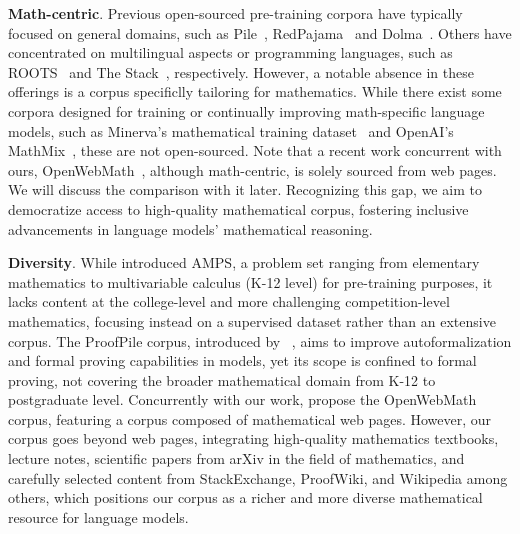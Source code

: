 \textbf{Math-centric}. Previous open-sourced pre-training corpora have typically focused on general domains, such as Pile~\citep{DBLP:journals/corr/abs-2101-00027-pile}, RedPajama~\citep{RedPajama} and Dolma~\citep{allenai-dolma}. Others have concentrated on multilingual aspects or programming languages, such as ROOTS~\citep{DBLP:conf/nips/LaurenconSWAMSW22-roots} and The Stack~\citep{DBLP:journals/corr/abs-2211-15533-stack}, respectively. However, a notable absence in these offerings is a corpus specificlly tailoring for mathematics. While there exist some corpora designed for training or continually improving math-specific language models, such as Minerva's mathematical training dataset~\citep{DBLP:conf/nips/LewkowyczADDMRS22-minerva} and  OpenAI's MathMix~\citep{DBLP:journals/corr/abs-2305-20050-lets-verify-step-by-step}, these are not open-sourced. Note that a recent work concurrent with ours, OpenWebMath~\citep{DBLP:journals/corr/abs-2310-06786-openwebmath}, although math-centric, is solely sourced from web pages. We will discuss the comparison with it later. 
Recognizing this gap, we aim to democratize access to high-quality mathematical corpus, 
fostering inclusive advancements in language models' mathematical reasoning.

\textbf{Diversity}. While \citet{DBLP:conf/nips/HendrycksBKABTS21-math} introduced AMPS, a problem set ranging from elementary mathematics to multivariable calculus (K-12 level) for pre-training purposes, it lacks content at the college-level and more challenging competition-level mathematics, focusing instead on a supervised dataset rather than an extensive corpus. The ProofPile corpus, introduced by~ \citet{DBLP:journals/corr/abs-2302-12433-proofpile}, aims to improve autoformalization and formal proving capabilities in models, yet its scope is confined to formal proving, not covering the broader mathematical domain from K-12 to postgraduate level. Concurrently with our work, \citet{DBLP:journals/corr/abs-2310-06786-openwebmath}
propose the OpenWebMath corpus, featuring a corpus composed of mathematical web pages. However, our corpus goes beyond web pages, integrating high-quality mathematics textbooks, lecture notes, scientific papers from arXiv in the field of mathematics, and carefully selected content from StackExchange, ProofWiki, and Wikipedia  among others, which positions our corpus as a richer and more diverse mathematical resource for language models.

